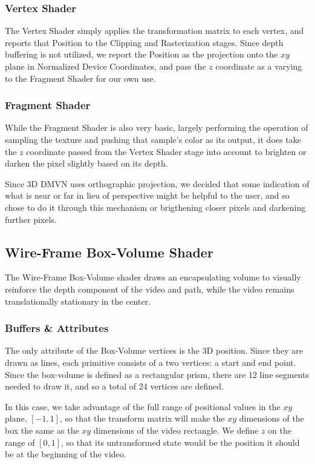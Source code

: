 \subsubsection{Vertex Shader}
The Vertex Shader simply applies the transformation matrix to each vertex, and reports that Position to the Clipping and Rasterization stages. Since depth buffering is not utilized, we report the Position as the projection onto the $xy$ plane in Normalized Device Coordinates, and pass the $z$ coordinate as a varying to the Fragment Shader for our own use.

\subsubsection{Fragment Shader}
While the Fragment Shader is also very basic, largely performing the operation of sampling the texture and pushing that sample's color as its output, it does take the $z$ coordinate passed from the Vertex Shader stage into account to brighten or darken the pixel slightly based on its depth.
\par Since 3D DMVN uses orthographic projection, we decided that some indication of what is near or far in lieu of perspective might be helpful to the user, and so chose to do it through this mechanism or brigthening closer pixels and darkening further pixels.

\subsection{Wire-Frame Box-Volume Shader}
The Wire-Frame Box-Volume shader draws an encapsulating volume to visually reinforce the depth component of the video and path, while the video remains translationally stationary in the center.

\subsubsection{Buffers \& Attributes}
The only attribute of the Box-Volume vertices is the 3D position. Since they are drawn as lines, each primitive consists of a two vertices: a start and end point. Since the box-volume is defined as a rectangular prism, there are 12 line segments needed to draw it, and so a total of 24 vertices are defined.
\par In this case, we take advantage of the full range of positional values in the $xy$ plane, $[-1,1]$, so that the transform matrix will make the $xy$ dimensions of the box the same as the $xy$ dimensions of the video rectangle. We define $z$ on the range of $[0,1]$, so that its untransformed state would be the position it should be at the beginning of the video.


